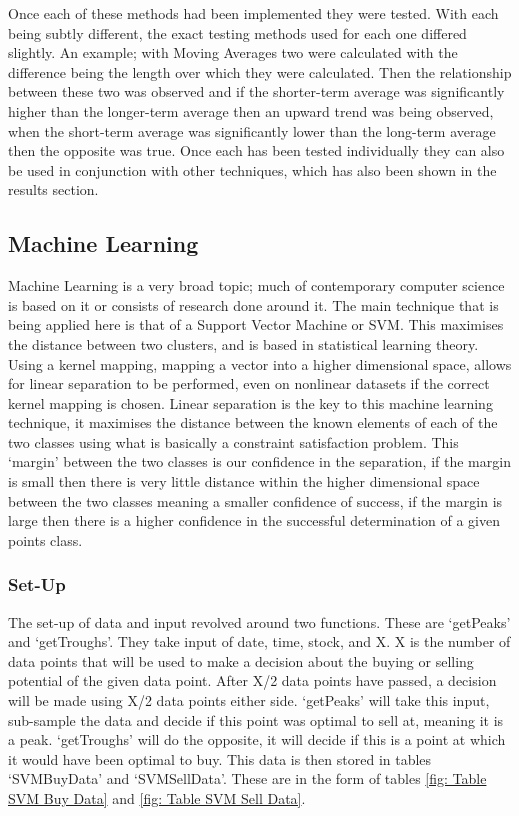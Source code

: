 \documentclass[conference]{IEEEtran}
\begin{document}
Once each of these methods had been implemented they were tested. With each being subtly different, the exact testing methods used for each one differed slightly. An example; with Moving Averages two were calculated with the difference being the length over which they were calculated. Then the relationship between these two was observed and if the shorter-term average was significantly higher than the longer-term average then an upward trend was being observed, when the short-term average was significantly lower than the long-term average then the opposite was true. Once each has been tested individually they can also be used in conjunction with other techniques, which has also been shown in the results section. 

\subsection{Machine Learning}
 \noindent
Machine Learning is a very broad topic; much of contemporary computer science is based on it or consists of research done around it. The main technique that is being applied here is that of a Support Vector Machine or SVM. This maximises the distance between two clusters, and is based in statistical learning theory. Using a kernel mapping, mapping a vector into a higher dimensional space, allows for linear separation to be performed, even on nonlinear datasets if the correct kernel mapping is chosen. Linear separation is the key to this machine learning technique, it maximises the distance between the known elements of each of the two classes using what is basically a constraint satisfaction problem. This `margin' between the two classes is our confidence in the separation, if the margin is small then there is very little distance within the higher dimensional space between the two classes meaning a smaller confidence of success, if the margin is large then there is a higher confidence in the successful determination of a given points class. \cite{Wilson2008}\\

\subsubsection{Set-Up}

The set-up of data and input revolved around two functions. These are `getPeaks' and `getTroughs'.
They take input of date, time, stock, and X. X is the number of data points that will be used to make a decision about the buying or selling potential of the given data point. After X/2 data points have passed, a decision will be made using X/2 data points either side. `getPeaks' will take this input, sub-sample the data and decide if this point was optimal to sell at, meaning it is a peak. `getTroughs' will do the opposite, it will decide if this is a point at which it would have been optimal to buy. This data is then stored in tables `SVMBuyData' and `SVMSellData'. These are in the form of tables \ref{fig: Table SVM Buy Data} and \ref{fig: Table SVM Sell Data}.
\end{document}
